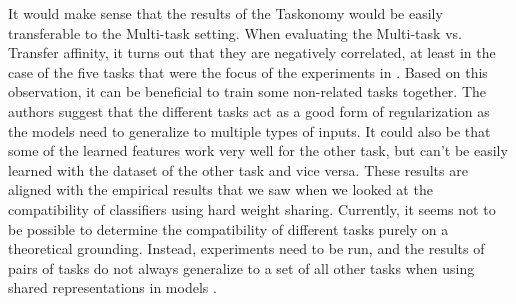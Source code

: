 It would make sense that the results of the Taskonomy would be easily transferable to the Multi-task setting.
When evaluating the Multi-task vs. Transfer affinity, it turns out that they are negatively correlated, at least in the case of the five tasks that were the focus of the experiments in \citep{whichTasks}.
Based on this observation, it can be beneficial to train some non-related tasks together.
The authors suggest that the different tasks act as a good form of regularization as the models need to generalize to multiple types of inputs.
It could also be that some of the learned features work very well for the other task, but can't be easily learned with the dataset of the other task and vice versa.
These results are aligned with the empirical results that we saw when we looked at the compatibility of classifiers using hard weight sharing.
Currently, it seems not to be possible to determine the compatibility of different tasks purely on a theoretical grounding.
Instead, experiments need to be run, and the results of pairs of tasks do not always generalize to a set of all other tasks when using shared representations in models \citep{visualPerson}.
